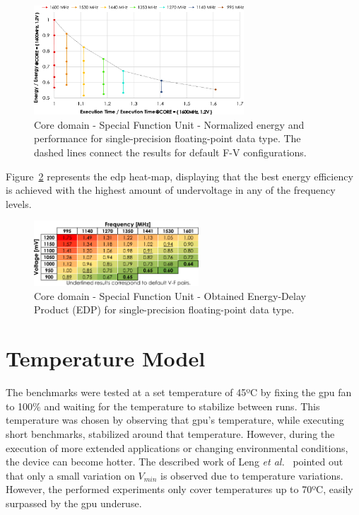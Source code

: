 \begin{figure}[htb]
  \centering
  \includegraphics[width=0.7\textwidth]{Figures/GPU_characterization/SFU_behaviour.pdf}
  \caption{Core domain - Special Function Unit - Normalized energy and performance for single-precision floating-point data type. The dashed lines connect the results for default F-V configurations.}
  \label{fig:SFU_behaviour}
\end{figure}

Figure~\ref{fig:SFU_EDP} represents the \acrshort{edp} heat-map, displaying that the best energy efficiency is achieved with the highest amount of undervoltage in any of the frequency levels.

\begin{figure}[htb]
    \centering
        \includegraphics[width=0.55\textwidth]{Figures/GPU_characterization/SFU_EDP_SP.pdf}
        \caption{Core domain - Special Function Unit - Obtained Energy-Delay Product (EDP) for single-precision floating-point data type.}
    \label{fig:SFU_EDP}
\end{figure}

\section{Temperature Model}
\label{sec:temp_model}

The benchmarks were tested at a set temperature of 45ºC by fixing the \acrshort{gpu} fan to 100\% and waiting for the temperature to stabilize between runs. This temperature was chosen by observing that \acrshort{gpu}'s temperature, while executing short benchmarks, stabilized around that temperature. However, during the execution of more extended applications or changing environmental conditions, the device can become hotter. The described work of Leng \textit{et al.}~\cite{leng_safe_2015} pointed out that only a small variation on $V_{min}$ is observed due to temperature variations. However, the performed experiments only cover temperatures up to 70ºC, easily surpassed by the \acrshort{gpu} underuse. 

